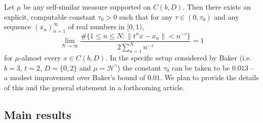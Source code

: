 \documentclass[12pt]{article}
\theoremstyle{definition}
\theoremstyle{remark}
\begin{document}
    Let $\mu$ be any self-similar measure supported on   $C(b,D)$.   Then there exists an explicit, computable  constant $\tau_0>0$ such that for any  $\tau\in(0,\tau_0)$ and any sequence $(x_{n})_{n=1}^{\infty}$  of real numbers in $[0,1)$,
$$\lim_{N\to\infty}\frac{\#\{1\le n\le N:\|t^{n}x-x_{n}\|<n^{-\tau}\}}{2\sum_{n=1}^{N}n^{-\tau}}=1 $$
for $\mu$-almost  every $x\in C(b,D)$.   In the specific  setup considered by Baker (i.e.  $b=3$, $t=2$, $D=\{0,2\}$ and   $\mu= \mathcal{H}^{\gamma} $) the constant $ \tau_0 $  can be taken to be $0.013$  -- a modest improvement over Baker's bound of $0.01$.  We plan to provide the details of this and the general statement  in a forthcoming article.

\subsection{Main results}  \label{mainresSV}


\end{document}
